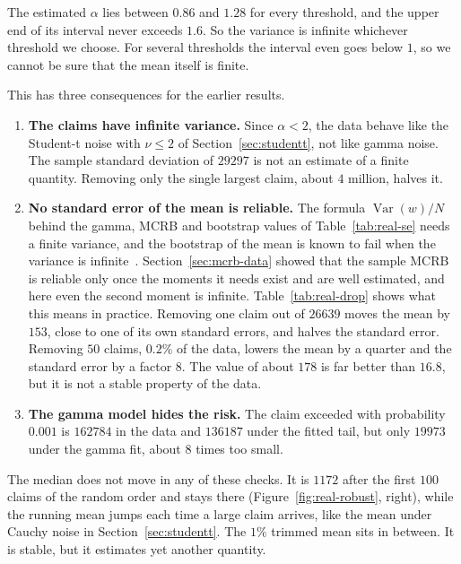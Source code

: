 \documentclass[11pt]{article}
\numberwithin{figure}{section}
\numberwithin{equation}{section}
\begin{document}
The estimated $\alpha$ lies between $0.86$ and $1.28$ for every threshold, and the upper end of its
interval never exceeds $1.6$. So the variance is infinite whichever threshold we choose. For several
thresholds the interval even goes below $1$, so we cannot be sure that the mean itself is finite.

This has three consequences for the earlier results.
\begin{enumerate}
  \item \textbf{The claims have infinite variance.} Since $\alpha < 2$, the data behave like the
        Student-t noise with $\nu \leq 2$ of Section~\ref{sec:studentt}, not like gamma noise. The
        sample standard deviation of $29297$ is not an estimate of a finite quantity. Removing only the
        single largest claim, about $4$ million, halves it.
  \item \textbf{No standard error of the mean is reliable.} The formula $\operatorname{Var}(w)/N$
        behind the gamma, MCRB and bootstrap values of Table~\ref{tab:real-se} needs a finite
        variance, and the bootstrap of the mean is known to fail when the variance is
        infinite~\cite{athreya}. Section~\ref{sec:mcrb-data} showed that the sample MCRB is reliable
        only once the moments it needs exist and are well estimated, and here even the second moment
        is infinite. Table~\ref{tab:real-drop} shows what this means in practice. Removing one
        claim out of $26639$ moves the mean by $153$, close to one of its own standard errors, and
        halves the standard error. Removing $50$ claims, $0.2\%$ of the data, lowers the mean by a
        quarter and the standard error by a factor $8$. The value of about $178$ is far better than
        $16.8$, but it is not a stable property of the data.
  \item \textbf{The gamma model hides the risk.} The claim exceeded with probability $0.001$ is
        $162784$ in the data and $136187$ under the fitted tail, but only $19973$ under the gamma fit,
        about $8$ times too small.
\end{enumerate}

The median does not move in any of these checks. It is $1172$ after the first $100$ claims of the
random order and stays there (Figure~\ref{fig:real-robust}, right), while the running mean jumps each
time a large claim arrives, like the mean under Cauchy noise in Section~\ref{sec:studentt}. The $1\%$
trimmed mean sits in between. It is stable, but it estimates yet another quantity.
\end{document}

